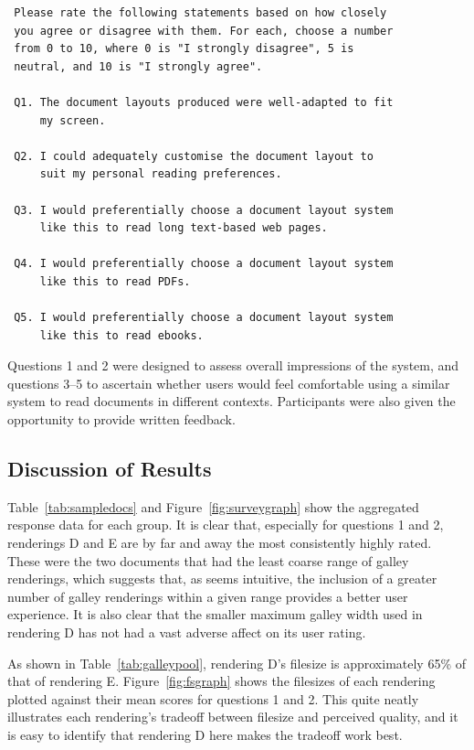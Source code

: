 \begin{verbatim}
 Please rate the following statements based on how closely
 you agree or disagree with them. For each, choose a number
 from 0 to 10, where 0 is "I strongly disagree", 5 is
 neutral, and 10 is "I strongly agree".

 Q1. The document layouts produced were well-adapted to fit
     my screen.

 Q2. I could adequately customise the document layout to
     suit my personal reading preferences.

 Q3. I would preferentially choose a document layout system
     like this to read long text-based web pages.

 Q4. I would preferentially choose a document layout system
     like this to read PDFs.

 Q5. I would preferentially choose a document layout system
     like this to read ebooks.
\end{verbatim}

Questions 1 and 2 were designed to assess overall impressions of the system, and questions 3--5 to ascertain whether users would feel comfortable using a similar system to read documents in different contexts.
Participants were also given the opportunity to provide written feedback.

\subsection{Discussion of Results}
Table~\ref{tab:sampledocs} and Figure~\ref{fig:surveygraph} show the aggregated response data for each group. It is clear that, especially for questions 1 and 2, renderings D and E are by far and away the most consistently highly rated. These were the two documents that had the least coarse range of \gls{galley} renderings, which suggests that, as seems intuitive, the inclusion of a greater number of \gls{galley} renderings within a given range provides a better user experience. It is also clear that the smaller maximum \gls{galley} width used in rendering D has not had a vast adverse affect on its user rating.

As shown in Table~\ref{tab:galleypool}, rendering D's filesize is approximately 65\% of that of rendering E. Figure~\ref{fig:fsgraph} shows the filesizes of each rendering plotted against their mean scores for questions 1 and 2. This quite neatly illustrates each rendering's tradeoff between filesize and perceived quality, and it is easy to identify that rendering D here makes the tradeoff work best.

